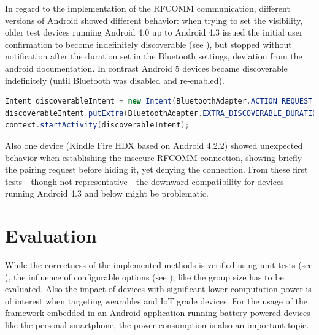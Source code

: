 In regard to the implementation of the \gls{RFCOMM} communication, different versions of Android showed different behavior: when trying to set the visibility, older test devices running Android 4.0 up to Android 4.3 issued the initial user confirmation to become indefinitely discoverable (see ), but stopped without notification after the duration set in the Bluetooth settings, deviation from the android documentation. In contrast Android 5 devices became discoverable indefinitely (until Bluetooth was disabled and re-enabled). 

\begin{lstlisting}[language=Java, caption={Android discoverable intent}, label={Android discoverable intent}, float, floatplacement=H]
Intent discoverableIntent = new Intent(BluetoothAdapter.ACTION_REQUEST_DISCOVERABLE);
discoverableIntent.putExtra(BluetoothAdapter.EXTRA_DISCOVERABLE_DURATION, 0);
context.startActivity(discoverableIntent);
\end{lstlisting}

Also one device (Kindle Fire HDX based on Android 4.2.2) showed unexpected behavior when establishing the insecure \gls{RFCOMM} connection, showing briefly the pairing request before hiding it, yet denying the connection. From these first tests - though not representative - the downward compatibility for devices running Android 4.3 and below might be problematic.

\FloatBarrier


\chapter{Evaluation} \label{Evaluation}

While the correctness of the implemented methods is verified using unit tests (see ), the influence of configurable options (see ), like the group size has to be evaluated. Also the impact of devices with significant lower computation power is of interest when targeting wearables and \gls{IoT} grade devices.
For the usage of the framework embedded in an Android application running battery powered devices like the personal smartphone, the power consumption is also an important topic.



